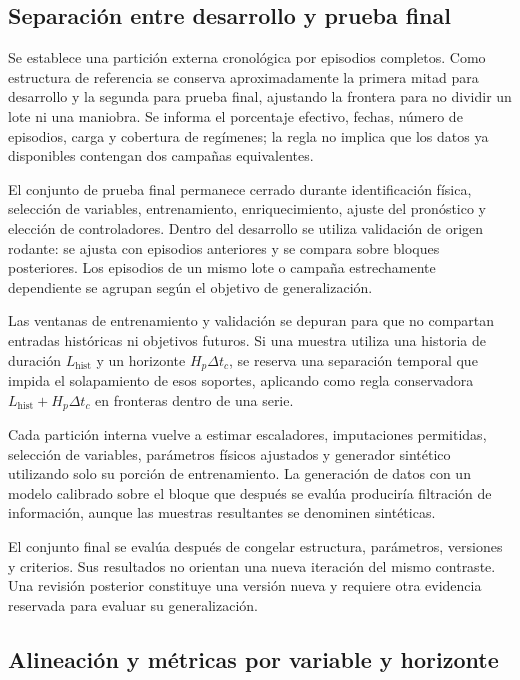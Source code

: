 \subsection{Separación entre desarrollo y prueba final}
\label{met:particion}

Se establece una partición externa cronológica por episodios completos. Como estructura de referencia se conserva aproximadamente la primera mitad para desarrollo y la segunda para prueba final, ajustando la frontera para no dividir un lote ni una maniobra. Se informa el porcentaje efectivo, fechas, número de episodios, carga y cobertura de regímenes; la regla no implica que los datos ya disponibles contengan dos campañas equivalentes.

El conjunto de prueba final permanece cerrado durante identificación física, selección de variables, entrenamiento, enriquecimiento, ajuste del pronóstico y elección de controladores. Dentro del desarrollo se utiliza validación de origen rodante: se ajusta con episodios anteriores y se compara sobre bloques posteriores. Los episodios de un mismo lote o campaña estrechamente dependiente se agrupan según el objetivo de generalización.

Las ventanas de entrenamiento y validación se depuran para que no compartan entradas históricas ni objetivos futuros. Si una muestra utiliza una historia de duración $L_{\mathrm{hist}}$ y un horizonte $H_p\Delta t_c$, se reserva una separación temporal que impida el solapamiento de esos soportes, aplicando como regla conservadora $L_{\mathrm{hist}}+H_p\Delta t_c$ en fronteras dentro de una serie.

Cada partición interna vuelve a estimar escaladores, imputaciones permitidas, selección de variables, parámetros físicos ajustados y generador sintético utilizando solo su porción de entrenamiento. La generación de datos con un modelo calibrado sobre el bloque que después se evalúa produciría filtración de información, aunque las muestras resultantes se denominen sintéticas.

El conjunto final se evalúa después de congelar estructura, parámetros, versiones y criterios. Sus resultados no orientan una nueva iteración del mismo contraste. Una revisión posterior constituye una versión nueva y requiere otra evidencia reservada para evaluar su generalización.

\subsection{Alineación y métricas por variable y horizonte}
\label{met:metricas}

